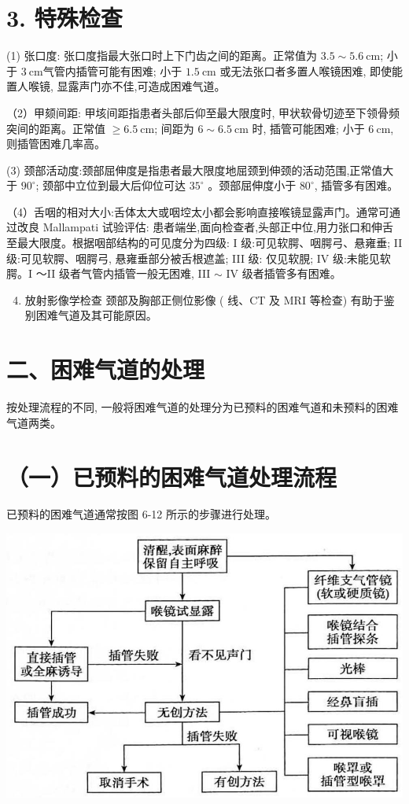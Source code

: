 \documentclass[10pt]{article}
\begin{document}
\section*{3. 特殊检查}
(1) 张口度: 张口度指最大张口时上下门齿之间的距离。正常值为 $3.5 \sim 5.6 \mathrm{~cm}$; 小于 $3 \mathrm{~cm}$气管内插管可能有困难; 小于 $1.5 \mathrm{~cm}$ 或无法张口者多置人喉镜困难, 即使能置人喉镜, 显露声门亦不佳,可造成困难气道。

（2）甲颏间距: 甲垓间距指患者头部后仰至最大限度时, 甲状软骨切迹至下领骨频突间的距离。正常值 $\geqslant 6.5 \mathrm{~cm}$; 间距为 $6 \sim 6.5 \mathrm{~cm}$ 时, 插管可能困难; 小于 $6 \mathrm{~cm}$, 则插管困难几率高。

(3) 颈部活动度:颈部屈伸度是指患者最大限度地屈颈到伸颈的活动范围,正常值大于 $90^{\circ}$; 颈部中立位到最大后仰位可达 $35^{\circ}$ 。颈部屈伸度小于 $80^{\circ}$, 插管多有困难。

（4）舌咽的相对大小:舌体太大或咽埪太小都会影响直接喉镜显露声门。通常可通过改良 Mallampati 试验评估: 患者端坐,面向检查者,头部正中位,用力张口和伸舌至最大限度。根据咽部结构的可见度分为四级: I 级:可见软腭、咽腭弓、悬雍垂; II 级:可见软腭、咽腭弓, 悬雍垂部分被舌根遮盖; III 级: 仅见软䏹; IV 级:未能见软腭。I ～II 级者气管内插管一般无困难, III $\sim$ IV 级者插管多有困难。

\begin{enumerate}
  \setcounter{enumi}{3}
  \item 放射影像学检查 颈部及胸部正侧位影像 ( 线、CT 及 MRI 等检查) 有助于鉴别困难气道及其可能原因。
\end{enumerate}

\section*{二、困难气道的处理}
按处理流程的不同, 一般将困难气道的处理分为已预料的困难气道和未预料的困难气道两类。

\section*{（一）已预料的困难气道处理流程}
已预料的困难气道通常按图 6-12 所示的步骤进行处理。

\begin{center}
\includegraphics[max width=\textwidth]{2024_07_09_002a177993bd97d1d6d7g-097}
\end{center}
\end{document}
